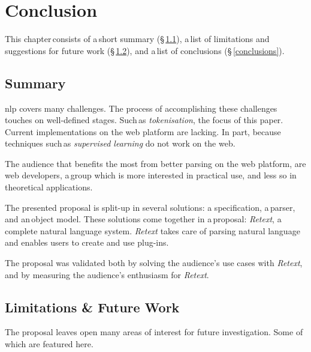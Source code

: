 \chapter{Conclusion}\label{conclusion}

This chapter\,consists of a\,short summary (§\,\ref{summary}), a\,list of
  limitations and suggestions for future work
  (§\,\ref{limitations-future-work}), and a\,list of conclusions
  (§\,\ref{conclusions}).

\section{Summary}\label{summary}

\gls{nlp} covers many challenges.
The process of accomplishing these challenges touches on well-defined stages.
Such\,as \emph{tokenisation}, the focus of this paper.
Current implementations on the web platform are lacking.
In part, because techniques such\,as \emph{supervised learning} do not work
  on the web.

The audience that benefits the most from better parsing on the web platform,
  are web developers, a\,group which is more interested in practical use, and
  less so in theoretical applications.

The presented proposal is split-up in several solutions: a specification,
  a\,parser, and an\,object model.
These solutions come together in a\,proposal: \emph{Retext}, a\,complete
  natural language system.
\emph{Retext} takes care of parsing natural language and enables users to
  create and use plug-ins.

The proposal was validated both by solving the audience's use cases with
  \emph{Retext}, and by measuring the audience's enthusiasm for \emph{Retext}.

\section{Limitations \& Future Work}\label{limitations-future-work}

The proposal leaves open many areas of interest for future investigation.
Some of which are featured here.

